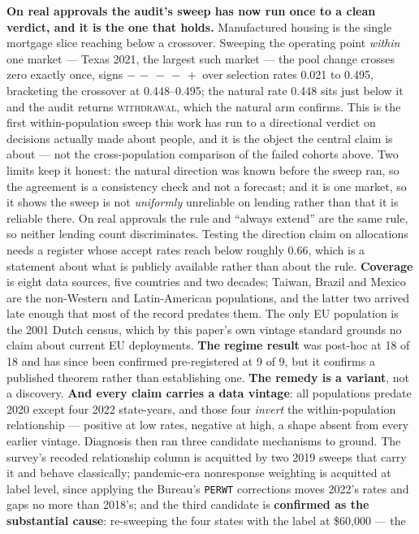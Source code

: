 \documentclass[conference]{IEEEtran}
\begin{document}
\textbf{On real approvals the audit's sweep has now run once to a clean verdict, and it is the
one that holds.} Manufactured housing is the single mortgage slice reaching below a crossover.
Sweeping the operating point \emph{within} one market --- Texas 2021, the largest such market
--- the pool change crosses zero exactly once, signs $-\,-\,-\,-\,+$ over selection rates
0.021 to 0.495, bracketing the crossover at 0.448--0.495; the natural rate 0.448 sits just
below it and the audit returns \textsc{withdrawal}, which the natural arm confirms. This is the
first within-population sweep this work has run to a directional verdict on decisions actually
made about people, and it is the object the central claim is about --- not the cross-population
comparison of the failed cohorts above. Two limits keep it honest: the natural direction was
known before the sweep ran, so the agreement is a consistency check and not a forecast; and it
is one market, so it shows the sweep is not \emph{uniformly} unreliable on lending rather than
that it is reliable there.
 On real approvals the rule
and ``always extend'' are the same rule, so neither lending count discriminates. Testing the
direction claim on allocations needs a register whose accept rates reach below roughly 0.66,
which is a statement about what is publicly available rather than about the rule.
\textbf{Coverage} is eight data sources, five
countries and two decades; Taiwan, Brazil and Mexico are the non-Western and
Latin-American populations, and the latter two arrived late enough that most of the
record predates them. The only EU population is the 2001 Dutch census, which by this paper's own
vintage standard grounds no claim about current EU deployments. \textbf{The regime result} was post-hoc at 18 of 18 and has since been confirmed
pre-registered at 9 of 9, but it confirms a published theorem rather than establishing one.
\textbf{The remedy is a variant}, not a discovery. \textbf{And every claim carries a data
vintage}: all populations predate 2020 except four 2022 state-years, and those four
\emph{invert} the within-population relationship --- positive at low rates, negative at
high, a shape absent from every earlier vintage. Diagnosis then ran three candidate
mechanisms to ground. The survey's recoded relationship column is acquitted by two 2019
sweeps that carry it and behave classically; pandemic-era nonresponse weighting is
acquitted at label level, since applying the Bureau's \texttt{PERWT} corrections moves
2022's rates and gaps no more than 2018's; and the third candidate is \textbf{confirmed as
the substantial cause}: re-sweeping the four states with the label at \$60{,}000 --- the
\end{document}
